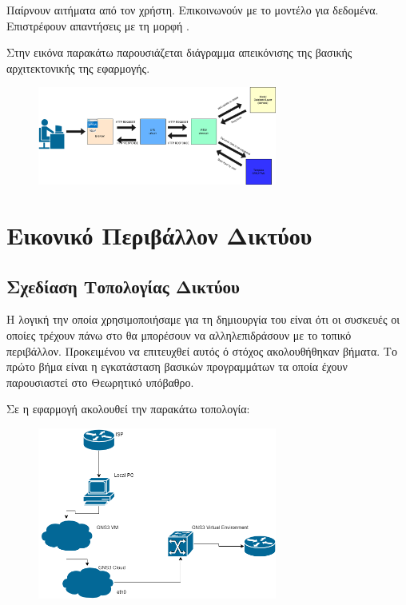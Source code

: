 Παίρνουν αιτήματα από τον χρήστη.
Επικοινωνούν με το μοντέλο για δεδομένα.
Επιστρέφουν απαντήσεις με τη μορφή .

Στην εικόνα παρακάτω παρουσιάζεται διάγραμμα απεικόνισης της βασικής αρχιτεκτονικής της εφαρμογής.

\begin{figure}[h]
	\centering
	\includegraphics[width=0.7\textwidth]{graphics/MTV.drawio.png}
	\caption{}
\end{figure}



\section{Εικονικό Περιβάλλον Δικτύου }



\subsection{Σχεδίαση Τοπολογίας Δικτύου}

Η λογική την οποία χρησιμοποιήσαμε για τη δημιουργία του  
είναι ότι οι συσκευές οι οποίες τρέχουν πάνω στο  θα μπορέσουν
να αλληλεπιδράσουν με το τοπικό  περιβάλλον. Προκειμένου να επιτευχθεί αυτός ό στόχος
ακολουθήθηκαν βήματα. Το πρώτο βήμα είναι η εγκατάσταση βασικών προγραμμάτων τα οποία έχουν παρουσιαστεί στο Θεωρητικό υπόβαθρο.

Σε  η εφαρμογή ακολουθεί την παρακάτω τοπολογία:

\FloatBarrier

\begin{figure}[htb]
	\centering
	\includegraphics[width=0.7\textwidth]{graphics/diagram.drawio.png}
	\caption{ }
\end{figure}


